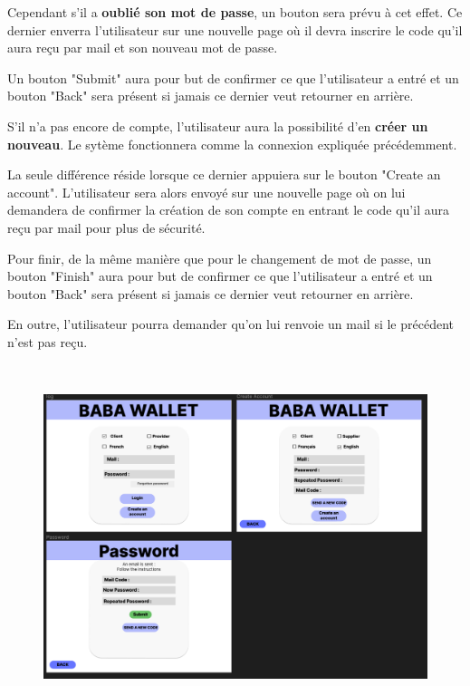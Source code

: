 \begin{flushleft}
Cependant s'il a \textbf{oublié son mot de passe}, un bouton sera prévu à cet effet.
Ce dernier enverra l'utilisateur sur une nouvelle page où il devra inscrire le code qu'il aura reçu par mail et son nouveau mot de passe.
\end{flushleft}

\begin{flushleft}
Un bouton "Submit" aura pour but de confirmer ce que l'utilisateur a entré et un bouton "Back" sera présent si jamais ce dernier veut retourner en arrière.
\end{flushleft}


\begin{flushleft}
S'il n'a pas encore de compte, l'utilisateur aura la possibilité d'en \textbf{créer un nouveau}. 
Le sytème fonctionnera comme la connexion expliquée précédemment.
\end{flushleft}

\begin{flushleft}
La seule différence réside lorsque ce dernier appuiera sur le bouton "Create an account". 
L'utilisateur sera alors envoyé sur une nouvelle page où on lui demandera de confirmer la création de son compte en entrant le code qu'il aura reçu par mail pour plus de sécurité.
\end{flushleft}

\begin{flushleft}
Pour finir, de la même manière que pour le changement de mot de passe, un bouton "Finish" aura pour but de confirmer ce que l'utilisateur a entré et un bouton "Back" sera présent si jamais ce dernier veut retourner en arrière.
\end{flushleft}

\begin{flushleft}
En outre, l'utilisateur pourra demander qu'on lui renvoie un mail si le précédent n'est pas reçu.
\end{flushleft}\

\newpage
\begin{figure}
    \centering
    \includegraphics[width = 1\textwidth]{Base/interface/img/Log.pdf}
\end{figure}
\newpage
